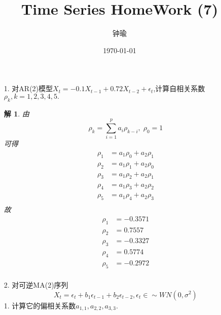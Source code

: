 \documentclass[11pt,a4paper]{ctexart}
\title{Time Series HomeWork (7)}
\author{钟瑜 \quad 222018314210044}
\date{\today}
\newtheorem*{solution}{解}
\begin{document}
\maketitle
\pagestyle{plain}%
\begin{enumerate}
	
\item[1.] 对AR(2)模型$ X_t=-0.1X_{t-1}+0.72X_{t-2}+\epsilon_t $,计算自相关系数$ \rho_k, k=1,2,3,4,5.$
\begin{solution}
由
\begin{equation}
\rho_k=\sum_{i=1}^{p}a_i\rho_{k-i},\;\rho_0=1
\end{equation}
可得
\begin{equation}
\begin{aligned}
\rho_1 &=a_1\rho_0+a_2\rho_1\\
\rho_2 &=a_1\rho_1+a_2\rho_0\\
\rho_3 &=a_1\rho_2+a_2\rho_1\\
\rho_4 &=a_1\rho_3+a_2\rho_2\\
\rho_5 &=a_1\rho_4+a_2\rho_3\\
\end{aligned}
\end{equation}
故
\begin{equation}
	\begin{aligned}
		\rho_1 &=-0.3571\\
		\rho_2 &=0.7557\\
		\rho_3 &=-0.3327\\
		\rho_4 &=0.5774\\
		\rho_5 &=-0.2972\\
	\end{aligned}
\end{equation}
\end{solution}


\item[2.]对可逆MA(2)序列
\begin{equation}
	X_t=\epsilon_t+b_1\epsilon_{t-1}+b_2\epsilon_{t-2}, \epsilon_t\in\sim WN(0,\sigma^2)
\end{equation}
1. 计算它的偏相关系数$ a_{1,1},a_{2,2},a_{3,3} $.


\end{enumerate}
\end{document}
